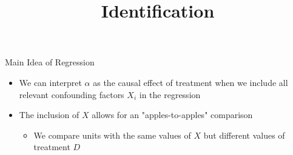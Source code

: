 \documentclass[dvipsnames,hyperref={pdfpagelabels=false}]{beamer}
\newcommand{\indep}{\perp\!\!\!\perp}
\begin{document}
\begin{frame}{Main Idea of Regression}
	\begin{itemize}
		\item We can interpret $\alpha$ as the causal effect of treatment when we include all relevant confounding factors $X_{i}$ in the regression
		\vspace{0.2cm}
		\item The inclusion of $X$ allows for an "apples-to-apples" comparison
		\vspace{0.2cm}
		\begin{itemize}
			\item We compare units with the same values of $X$ but different values of treatment $D$
			\vspace{0.2cm}
		\end{itemize}
	\end{itemize}
\end{frame}














\title[]  
{Identification}


\author 
{}

\institute{}






\date
{}


\begin{frame}{}
	\titlepage
\end{frame}
\end{document}
